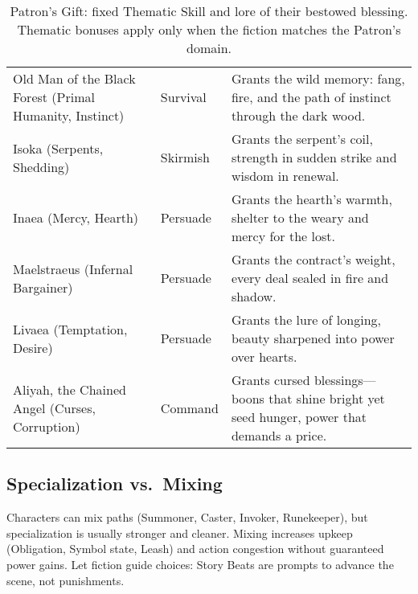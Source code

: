 \begin{table}[H]
\begin{tabular}{@{}p{3.8cm}p{3.8cm}p{7.5cm}@{}}
Old Man of the Black Forest (Primal Humanity, Instinct) & Survival & Grants the wild memory: fang, fire, and the path of instinct through the dark wood. \\
Isoka (Serpents, Shedding) & Skirmish & Grants the serpent’s coil, strength in sudden strike and wisdom in renewal. \\
Inaea (Mercy, Hearth) & Persuade & Grants the hearth’s warmth, shelter to the weary and mercy for the lost. \\
Maelstraeus (Infernal Bargainer) & Persuade & Grants the contract’s weight, every deal sealed in fire and shadow. \\
Livaea (Temptation, Desire) & Persuade & Grants the lure of longing, beauty sharpened into power over hearts. \\
Aliyah, the Chained Angel (Curses, Corruption) & Command & Grants cursed blessings—boons that shine bright yet seed hunger, power that demands a price. \\
\bottomrule
\end{tabular}
\caption{Patron’s Gift: fixed Thematic Skill and lore of their bestowed blessing. Thematic bonuses apply only when the fiction matches the Patron’s domain.}
\label{tab:gift-thematic-map}
\end{table}

\subsection{Specialization vs.\ Mixing}
\label{subsec:mixing}
Characters can mix paths (Summoner, Caster, Invoker, Runekeeper), but specialization is usually stronger and cleaner. Mixing increases upkeep (Obligation, Symbol state, Leash) and action congestion without guaranteed power gains. Let fiction guide choices: Story Beats are prompts to advance the scene, not punishments.

























